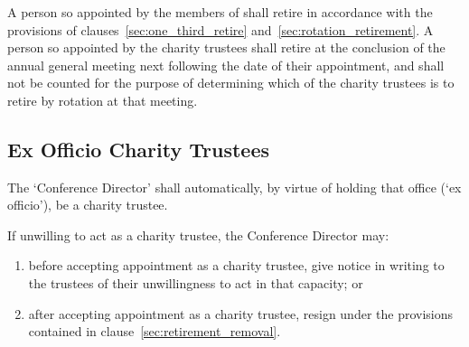         \subsubsection{}\label{sec:elected_trustee_retirement}
        A person so appointed by the members of \shortname{} shall retire in accordance with the provisions of clauses~\ref{sec:one_third_retire} and~\ref{sec:rotation_retirement}. A person so appointed by the charity trustees shall retire at the conclusion of the annual general meeting next following the date of their appointment, and shall not be counted for the purpose of determining which of the charity trustees is to retire by rotation at that meeting.

    \subsection{Ex Officio Charity Trustees}
    The `Conference Director' shall automatically, by virtue of holding that office (`ex officio'), be a charity trustee.

    If unwilling to act as a charity trustee, the Conference Director may:
    \begin{enumerate}
        \item before accepting appointment as a charity trustee, give notice in writing to the trustees of their unwillingness to act in that capacity; or
        \item after accepting appointment as a charity trustee, resign under the provisions contained in clause~\ref{sec:retirement_removal}.
    \end{enumerate}
